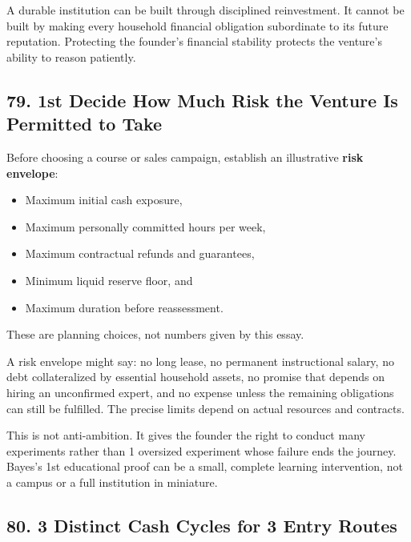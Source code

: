 A durable institution can be built through disciplined reinvestment. It cannot be built by making every household financial obligation subordinate to its future reputation. Protecting the founder's financial stability protects the venture's ability to reason patiently.

\subsection*{79. 1st Decide How Much Risk the Venture Is Permitted to Take}

Before choosing a course or sales campaign, establish an illustrative \textbf{risk envelope}:
\begin{itemize}
\item Maximum initial cash exposure,
\item Maximum personally committed hours per week,
\item Maximum contractual refunds and guarantees,
\item Minimum liquid reserve floor, and
\item Maximum duration before reassessment.
\end{itemize}
These are planning choices, not numbers given by this essay.

A risk envelope might say: no long lease, no permanent instructional salary, no debt collateralized by essential household assets, no promise that depends on hiring an unconfirmed expert, and no expense unless the remaining obligations can still be fulfilled. The precise limits depend on actual resources and contracts.

This is not anti-ambition. It gives the founder the right to conduct many experiments rather than 1 oversized experiment whose failure ends the journey. Bayes's 1st educational proof can be a small, complete learning intervention, not a campus or a full institution in miniature.

\subsection*{80. 3 Distinct Cash Cycles for 3 Entry Routes}

